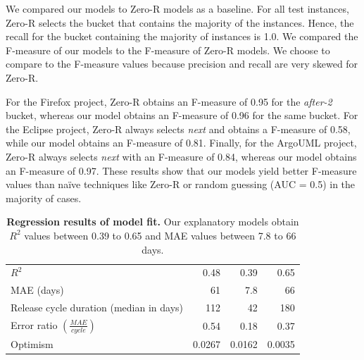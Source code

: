 \noindent\DIFdelbegin \textit{\textbf{}%
} %
\DIFdelend \DIFaddbegin {} \DIFaddend We compared our models to Zero-R models as a baseline. For all test
instances, Zero-R selects the bucket that contains the majority of the instances.
Hence, the recall for the bucket containing the majority of instances is 1.0. We
compared the F-measure of our models to the F-measure of Zero-R models. We
choose to compare to the F-measure values because precision and recall are very
skewed for Zero-R. 

For the Firefox project, Zero-R obtains an F-measure of 0.95 for the
\textit{after-2} bucket, whereas our model obtains an F-measure of 0.96 for the
same bucket. For the Eclipse project, Zero-R always selects \textit{next} and
obtains a F-measure of 0.58, while our model obtains an F-measure of 0.81.
Finally, for the ArgoUML project, Zero-R always selects \textit{next} with an
F-measure of 0.84, whereas our model obtains an F-measure of 0.97. These results
show that our models yield better F-measure values than na\"{i}ve techniques
like Zero-R or random guessing (AUC = 0.5) in the majority of cases.  

\DIFdelbegin %
\DIFdelend \DIFaddbegin {}
\DIFaddend 

\begin{table}
	\centering
	\footnotesize
	\caption{\textbf{Regression results of model fit.} Our explanatory
		models obtain $R^2$ values between 0.39 to 0.65 and MAE values between
	7.8 to 66 days.}
	\label{ch4:tbl:regression_results}
	\def\arraystretch{1.5}
	\begin{tabular}{lrrr}
		\hline 
		\centering{\textbf{Metric/Project}} &
		\centering{\textbf{Eclipse}} & \centering{\textbf{Firefox}} &
		\centering{\textbf{ArgoUML}} \tabularnewline
		\hline 
		$R^2$ & 0.48  & 0.39 & 0.65 \tabularnewline
		\hline 
		MAE (days) & 61 & 7.8  & 66 \tabularnewline
		\hline 
		Release cycle duration (median in days) & 112 & 42 & 180 \tabularnewline
		\hline
		Error ratio $(\frac{MAE}{cycle})$ & 0.54  & 0.18  & 0.37 \tabularnewline
		\hline 
		Optimism & 0.0267 & 0.0162 & 0.0035 \tabularnewline
		\hline 
	\end{tabular}
\end{table}

